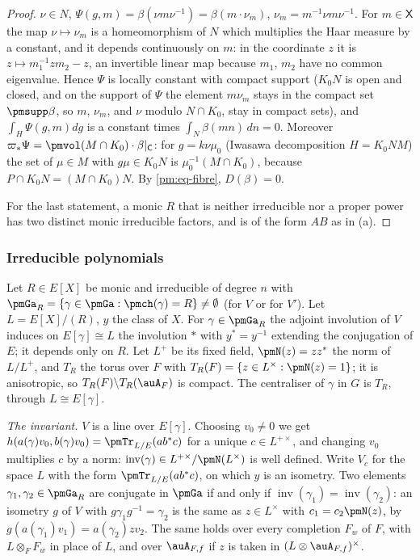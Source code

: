 \documentclass[10pt]{amsart}
\theoremstyle{definition}
\theoremstyle{remark}
\begin{document}
\begin{proof}
$\nu\in N$, $\Psi(g,m)=\beta(\nu m\nu^{-1})=\beta(m\cdot\nu_m)$, $\nu_m=m^{-1}\nu m\nu^{-1}$. For
$m\in\mathsf X$ the map $\nu\mapsto\nu_m$ is a homeomorphism of $N$ which multiplies the Haar
measure by a constant, and it depends continuously on $m$: in the coordinate $z$ it is
$z\mapsto m_1^{-1}zm_2-z$, an invertible linear map because $m_1$, $m_2$ have no common eigenvalue.
Hence $\Psi$ is locally constant with compact support ($K_0N$ is open and closed, and on the
support of $\Psi$ the element $m\nu_m$ stays in the compact set $\pmsupp\beta$, so $m$, $\nu_m$,
and $\nu$ modulo $N\cap K_0$, stay in compact sets), and $\int_H\Psi(g,m)dg$ is a constant times
$\int_N\beta(mn)\,dn=0$. Moreover $\varpi_*\Psi=\pmvol(M\cap K_0)\cdot\beta|_{\mathsf C}$: for
$g=k\nu\mu_0$ (Iwasawa decomposition $H=K_0NM$) the set of $\mu\in M$ with $g\mu\in K_0N$ is
$\mu_0^{-1}(M\cap K_0)$, because $P\cap K_0N=(M\cap K_0)N$. By \eqref{pm:eq-fibre}, $D(\beta)=0$.

For the last statement, a monic $R$ that is neither irreducible nor a proper power has two
distinct monic irreducible factors, and is of the form $AB$ as in (a).
\end{proof}

\subsubsection{Irreducible polynomials}\label{pm:ss-ell}

Let $R\in E[X]$ be monic and irreducible of degree $n$ with $\pmGa_R=\{\gamma\in\pmGa:
\pmch(\gamma)=R\}\ne\emptyset$ (for $V$ or for $V'$). Let $L=E[X]/(R)$, $y$ the class of $X$. For
$\gamma\in\pmGa_R$ the adjoint involution of $V$ induces on $E[\gamma]\cong L$ the involution
$*$ with $y^*=y^{-1}$ extending the conjugation of $E$; it depends only on $R$. Let $L^+$ be its
fixed field, $\pmN(z)=zz^*$ the norm of $L/L^+$, and $T_R$ the torus over $F$ with
$T_R(F)=\{z\in L^\times:\pmN(z)=1\}$; it is anisotropic, so $T_R(F)\backslash T_R(\auA_F)$ is
compact. The centraliser of $\gamma$ in $G$ is $T_R$, through $L\cong E[\gamma]$.

\emph{The invariant.} $V$ is a line over $E[\gamma]$. Choosing $v_0\ne0$ we get
$h(a(\gamma)v_0,b(\gamma)v_0)=\pmTr_{L/E}(ab^*c)$ for a unique $c\in L^{+\times}$, and changing
$v_0$ multiplies $c$ by a norm: $\operatorname{inv}(\gamma)\in L^{+\times}/\pmN(L^\times)$ is well
defined. Write $V_c$ for the space $L$ with the form $\pmTr_{L/E}(ab^*c)$, on which $y$ is an
isometry. Two elements $\gamma_1,\gamma_2\in\pmGa_R$ are conjugate in $\pmGa$ if and only if
$\operatorname{inv}(\gamma_1)=\operatorname{inv}(\gamma_2)$: an isometry $g$ of $V$ with
$g\gamma_1g^{-1}=\gamma_2$ is the same as $z\in L^\times$ with $c_1=c_2\pmN(z)$, by
$g(a(\gamma_1)v_1)=a(\gamma_2)zv_2$. The same holds over every completion $F_w$ of $F$, with
$L\otimes_FF_w$ in place of $L$, and over $\auA_{F,f}$ if $z$ is taken in $(L\otimes\auA_{F,f})^\times$.
\end{document}
